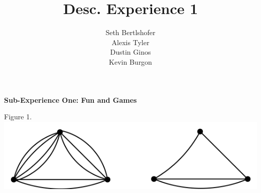 \documentclass[10pt,a4paper]{report}
\author{Seth Bertlshofer\\Alexis Tyler\\Dustin Ginos\\Kevin Burgon}
\title{Desc. Experience 1}
\begin{document}
	\maketitle
	\textbf{Sub-Experience One: Fun and Games}\\
	\begin{center}
		Figure 1.\\
		\includegraphics[scale=.5]{e1.png}
		\newline
		\newline
	\end{center}
	
\end{document}
